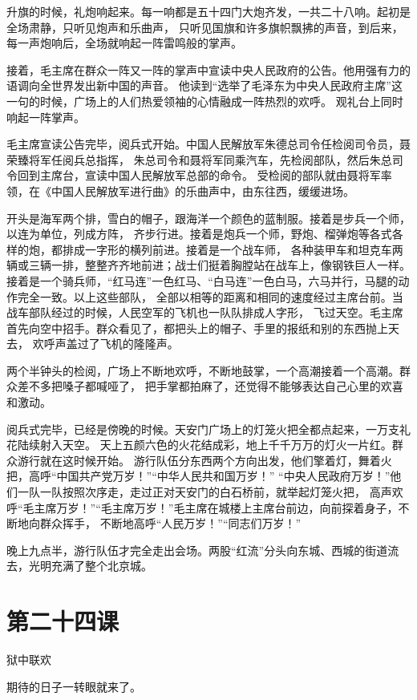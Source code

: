 \documentclass[12pt,UTF8]{ctexbook}
\begin{document}
升旗的时候，礼炮响起来。每一响都是五十四门大炮齐发，一共二十八响。起初是全场肃静，只听见炮声和乐曲声，
只听见国旗和许多旗帜飘拂的声音，到后来，每一声炮响后，全场就响起一阵雷鸣般的掌声。

接着，毛主席在群众一阵又一阵的掌声中宣读中央人民政府的公告。他用强有力的语调向全世界发出新中国的声音。
他读到“选举了毛泽东为中央人民政府主席”这一句的时候，广场上的人们热爱领袖的心情融成一阵热烈的欢呼。
观礼台上同时响起一阵掌声。

毛主席宣读公告完毕，阅兵式开始。中国人民解放军朱德总司令任检阅司令员，聂荣臻将军任阅兵总指挥，
朱总司令和聂将军同乘汽车，先检阅部队，然后朱总司令回到主席台，宣读中国人民解放军总部的命令。
受检阅的部队就由聂将军率领，在《中国人民解放军进行曲》的乐曲声中，由东往西，缓缓进场。

开头是海军两个排，雪白的帽子，跟海洋一个颜色的蓝制服。接着是步兵一个师，以连为单位，列成方阵，
齐步行进。接着是炮兵一个师，野炮、榴弹炮等各式各样的炮，都排成一字形的横列前进。接着是一个战车师，
各种装甲车和坦克车两辆或三辆一排，整整齐齐地前进；战士们挺着胸膛站在战车上，像钢铁巨人一样。
接着是一个骑兵师，“红马连”一色红马、“白马连”一色白马，六马并行，马腿的动作完全一致。以上这些部队，
全部以相等的距离和相同的速度经过主席台前。当战车部队经过的时候，人民空军的飞机也一队队排成人字形，
飞过天空。毛主席首先向空中招手。群众看见了，都把头上的帽子、手里的报纸和别的东西抛上天去，
欢呼声盖过了飞机的隆隆声。

两个半钟头的检阅，广场上不断地欢呼，不断地鼓掌，一个高潮接着一个高潮。群众差不多把嗓子都喊哑了，
把手掌都拍麻了，还觉得不能够表达自己心里的欢喜和激动。

阅兵式完毕，已经是傍晚的时候。天安门广场上的灯笼火把全都点起来，一万支礼花陆续射入天空。
天上五颜六色的火花结成彩，地上千千万万的灯火一片红。群众游行就在这时候开始。
游行队伍分东西两个方向出发，他们擎着灯，舞着火把，高呼“中国共产党万岁！”“中华人民共和国万岁！”
“中央人民政府万岁！”他们一队一队按照次序走，走过正对天安门的白石桥前，就举起灯笼火把，
高声欢呼“毛主席万岁！”“毛主席万岁！”毛主席在城楼上主席台前边，向前探着身子，不断地向群众挥手，
不断地高呼“人民万岁！”“同志们万岁！”

晚上九点半，游行队伍才完全走出会场。两股“红流”分头向东城、西城的街道流去，光明充满了整个北京城。

\section{第二十四课}

狱中联欢

期待的日子一转眼就来了。
\end{document}

